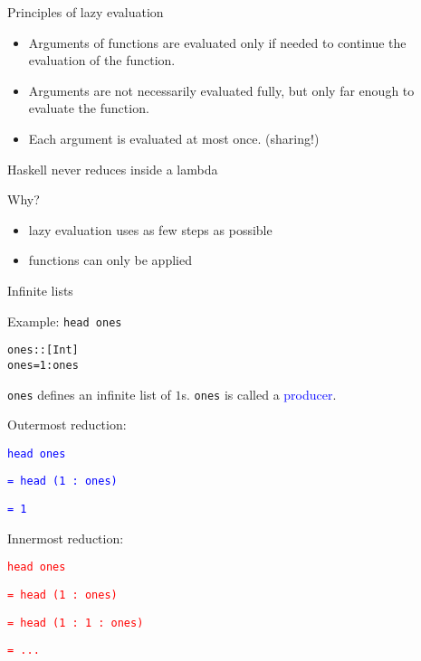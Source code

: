 \documentclass{beamer}
\def\code#1{\texttt{\frenchspacing#1}}
\begin{document}
\begin{frame}{Principles of lazy evaluation}

\begin{itemize}
    \item Arguments of functions are evaluated only if needed to continue the evaluation of the function.
    \item Arguments are not necessarily evaluated fully, but only far enough to evaluate the function.
    \item Each argument is evaluated at most once. (sharing!)
\end{itemize}

\pause

\vspace{1cm}
\begin{alertblock}{\centering Haskell never reduces inside a lambda}
\end{alertblock}

Why?\pause
\begin{itemize}
    \item lazy evaluation uses as few steps as possible
    \item functions can only be applied
\end{itemize}

\end{frame}

\begin{frame}[fragile]{Infinite lists}

\begin{exampleblock}{Example: \code{head ones}}
\begin{alltt}
ones :: [Int]
ones = 1 : ones
\end{alltt}

\code{ones} defines an infinite list of $1$s. \code{ones} is called a \textcolor{blue}{producer}.

\pause

\vspace{0.5cm}
Outermost reduction: \par
\textcolor{blue}{\code{head ones}} \par\pause
\textcolor{blue}{\code{= head (1 : ones)}} \par\pause
\textcolor{blue}{\code{= 1}}

\vspace{0.5cm}
Innermost reduction: \par
\textcolor{red}{\code{head ones}} \par\pause
\textcolor{red}{\code{= head (1 : ones)}} \par\pause
\textcolor{red}{\code{= head (1 : 1 : ones)}} \par
\textcolor{red}{\code{= ...}}
\end{exampleblock}

\end{frame}
\end{document}
